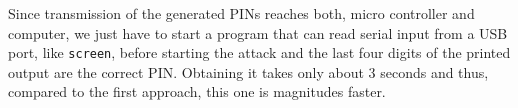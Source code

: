 Since transmission of the generated PINs reaches both, micro controller and computer, we just have to start a program that can read serial input from a USB port, like \texttt{screen}, before starting the attack and the last four digits of the printed output are the correct PIN. Obtaining it takes only about 3 seconds and thus, compared to the first approach, this one is magnitudes faster.










